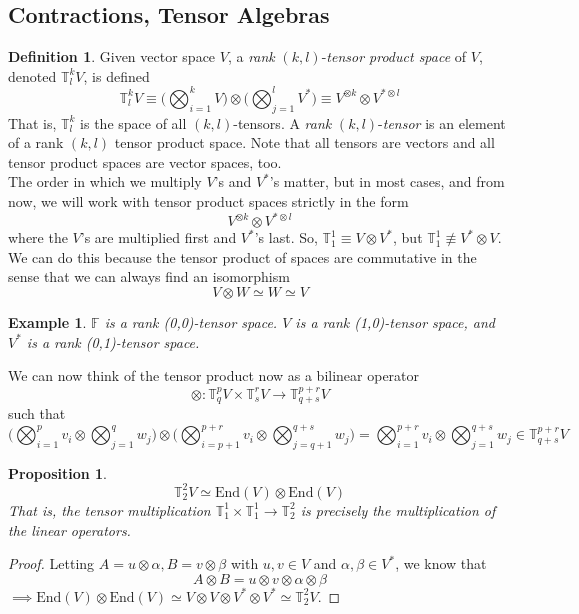 \documentclass{article}
\newtheorem{proposition}[theorem]{Proposition}
\newtheorem{example}{Example}[section]
\theoremstyle{remark}
\theoremstyle{definition}
\newtheorem{definition}{Definition}[section]
\begin{document}
\subsection{Contractions, Tensor Algebras}
\begin{definition}
Given vector space $V$, a \textit{rank }$(k, l)$-\textit{tensor product space} of $V$, denoted $\mathbb{T}^{k}_{l} V$, is defined
\[ \mathbb{T}^k_l V \equiv \bigg( \bigotimes_{i=1}^{k} V \bigg) \otimes \bigg( \bigotimes_{j=1}^{l} V^{*} \bigg) \equiv V^{\otimes k} \otimes V^{* \otimes l}\]
That is, $\mathbb{T}^{k}_{l}$ is the space of all $(k, l)$-tensors. A \textit{rank }$(k, l)$-\textit{tensor} is an element of a rank $(k, l)$ tensor product space. Note that all tensors are vectors and all tensor product spaces are vector spaces, too. 
\\

The order in which we multiply $V$'s and $V^*$'s matter, but in most cases, and from now, we will work with tensor product spaces strictly in the form 
\[ V^{\otimes k} \otimes V^{* \otimes l} \]
where the $V$'s are multiplied first and $V^*$'s last. So, $\mathbb{T}^{1}_{1} \equiv V \otimes V^*$, but $\mathbb{T}^{1}_{1} \not\equiv V^* \otimes V$. We can do this because the tensor product of spaces are commutative in the sense that we can always find an isomorphism
\[V \otimes W \simeq W \simeq V\]
\end{definition}

\begin{example}
$\mathbb{F}$ is a rank (0,0)-tensor space. $V$ is a rank (1,0)-tensor space, and $V^{*}$ is a rank (0,1)-tensor space. 
\end{example}

We can now think of the tensor product now as a bilinear operator
\[\otimes: \mathbb{T}^p_q V \times \mathbb{T}^r_s V \longrightarrow \mathbb{T}^{p+r}_{q+s} V\]
such that
\[\bigg( \bigotimes_{i=1}^p v_i \otimes \bigotimes_{j=1}^q w_j \bigg) \otimes \bigg( \bigotimes_{i = p+1}^{p+r} v_i \otimes \bigotimes_{j=q+1}^{q+s} w_j \bigg) = \bigotimes_{i=1}^{p+r} v_i \otimes \bigotimes_{j=1}^{q+s} w_j \in \mathbb{T}^{p+r}_{q+s} V\]

\begin{proposition}
\[\mathbb{T}^2_2 V \simeq \text{End}(V) \otimes \text{End}(V)\]
That is, the tensor multiplication $\mathbb{T}^1_1 \times \mathbb{T}^1_1 \longrightarrow \mathbb{T}^2_2$ is precisely the multiplication of the linear operators. 
\end{proposition}
\begin{proof}
Letting $A = u \otimes \alpha, B = v \otimes \beta$ with $u, v \in V$ and $\alpha, \beta \in V^*$, we know that
\[A \otimes B = u \otimes v \otimes \alpha \otimes \beta\]
$\implies \text{End}(V) \otimes \text{End}(V) \simeq V \otimes V \otimes V^* \otimes V^* \simeq \mathbb{T}^2_2 V$. 
\end{proof}
\end{document}
